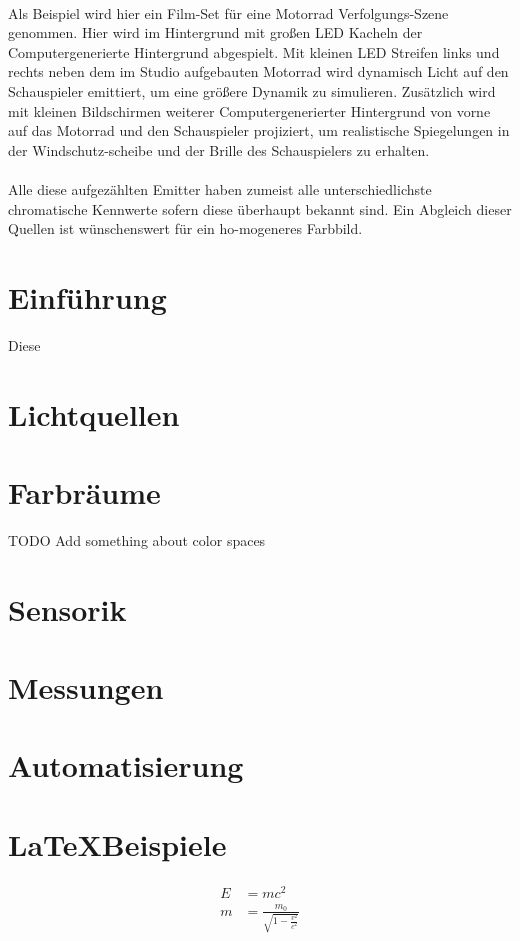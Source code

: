 \documentclass{scrartcl}
\begin{document}
\paragraph{}
Als Beispiel wird hier ein Film-Set für eine Motorrad Verfolgungs-Szene genommen. Hier wird im Hintergrund mit großen LED Kacheln der Computergenerierte Hintergrund abgespielt. Mit kleinen LED Streifen links und rechts neben dem im Studio aufgebauten Motorrad wird dynamisch Licht auf den Schauspieler emittiert, um eine größere Dynamik zu simulieren.
Zusätzlich wird mit kleinen Bildschirmen weiterer Computergenerierter Hintergrund von vorne auf das Motorrad und den Schauspieler projiziert, um realistische Spiegelungen in der Windschutz-scheibe und der Brille des Schauspielers zu erhalten.
\paragraph{}
Alle diese aufgezählten Emitter haben zumeist alle unterschiedlichste chromatische Kennwerte sofern diese überhaupt bekannt sind. Ein Abgleich dieser Quellen ist wünschenswert für ein ho-mogeneres Farbbild. 
\clearpage

\section{Einführung}
Diese
\clearpage

\section{Lichtquellen}
\clearpage

\section{Farbräume}
TODO Add something about color spaces
\clearpage

\section{Sensorik}
\clearpage

\section{Messungen}
\clearpage

\section{Automatisierung}
\clearpage


\section{\LaTeX Beispiele}
\begin{align}
E &= mc^2                 \\
m &= \frac{m_0}{\sqrt{1-\frac{v^2}{c^2}}}
\end{align}
\clearpage
\end{document}
